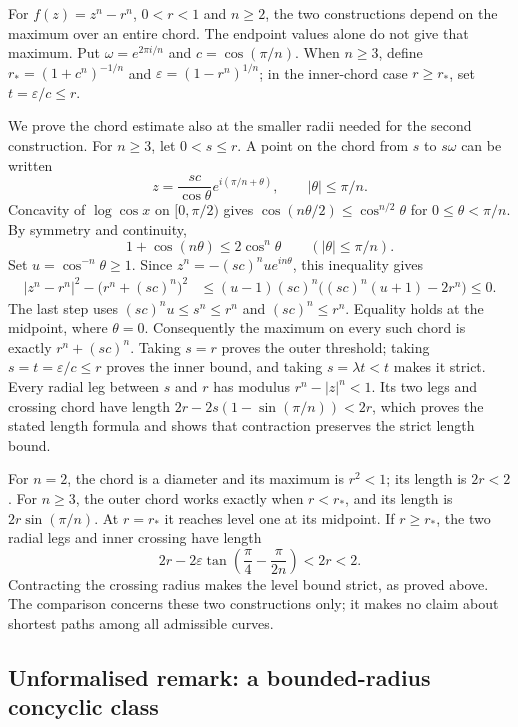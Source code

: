 \documentclass[11pt]{article}
\begin{document}
For $f(z)=z^n-r^n$, $0<r<1$ and $n\ge2$, the two constructions depend on the maximum over an entire
chord. The endpoint values alone do not give that maximum. Put
$\omega=e^{2\pi i/n}$ and $c=\cos(\pi/n)$. When $n\ge3$, define
$r_*=(1+c^n)^{-1/n}$ and $\varepsilon=(1-r^n)^{1/n}$; in the inner-chord
case $r\ge r_*$, set $t=\varepsilon/c\le r$.

We prove the chord estimate also at the smaller radii needed for the
second construction. For $n\ge3$, let $0<s\le r$. A point on the chord
from $s$ to $s\omega$ can be written
\[
 z=\frac{sc}{\cos\theta}e^{i(\pi/n+\theta)},
 \qquad |\theta|\le\pi/n.
\]
Concavity of $\log\cos x$ on $[0,\pi/2)$ gives
$\cos(n\theta/2)\le\cos^{n/2}\theta$ for $0\le\theta<\pi/n$.
By symmetry and continuity,
\[
 1+\cos(n\theta)\le2\cos^n\theta
 \qquad (|\theta|\le\pi/n).
\]
Set $u=\cos^{-n}\theta\ge1$. Since
$z^n=-(sc)^nu e^{in\theta}$, this inequality gives
\[
 \begin{split}
 |z^n-r^n|^2-\bigl(r^n+(sc)^n\bigr)^2
 &\le (u-1)(sc)^n\bigl((sc)^n(u+1)-2r^n\bigr)\le0.
 \end{split}
\]
The last step uses $(sc)^nu\le s^n\le r^n$ and
$(sc)^n\le r^n$. Equality holds at the midpoint, where $\theta=0$.
Consequently the maximum on every such chord is exactly
$r^n+(sc)^n$. Taking $s=r$ proves the outer threshold; taking
$s=t=\varepsilon/c\le r$ proves the inner bound, and taking
$s=\lambda t<t$ makes it strict. Every radial leg between $s$ and
$r$ has modulus $r^n-|z|^n<1$. Its two legs and crossing chord have
length $2r-2s(1-\sin(\pi/n))<2r$, which proves the stated length
formula and shows that contraction preserves the strict length bound.

For $n=2$, the chord is a diameter and its maximum is $r^2<1$;
its length is $2r<2$. For $n\ge3$, the outer chord works exactly when
$r<r_*$, and its length is $2r\sin(\pi/n)$. At $r=r_*$ it reaches
level one at its midpoint. If $r\ge r_*$, the two radial legs and
inner crossing have length
\[
 2r-2\varepsilon\tan\left(\frac\pi4-\frac\pi{2n}\right)<2r<2.
\]
Contracting the crossing radius makes the level bound strict, as
proved above. The comparison concerns these two constructions only; it makes no
claim about shortest paths among all admissible curves.

\subsection*{Unformalised remark: a bounded-radius concyclic class}
\end{document}
